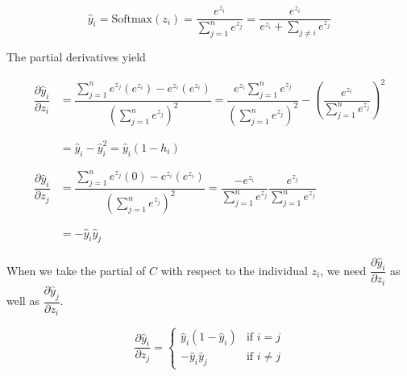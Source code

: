 \documentclass[pageno]{final_paper}
\begin{document}
\begin{equation}
    \label{eq: output layer value}
    \hat{y}_i = \text{Softmax}(z_i) = \dfrac{e^{z_i}}{\sum\limits_{j=1}^n e^{z_j}} = \dfrac{e^{z_i}}
    {e^{z_i} + \sum\limits_{j\neq i} e^{z_j}}
\end{equation}

The partial derivatives yield

\begin{equation}
    \label{eq: output partials}
    \begin{aligned}
        \dfrac{\partial \hat{y}_i}{\partial z_i} &= \dfrac{\sum\limits_{j=1}^n e^{z_j}(e^{z_i}) - e^{z_i}(e^{z_i})}
        {\left( \sum\limits_{j=1}^n e^{z_j} \right)^2}
        = \dfrac{e^{z_i}\sum\limits_{j=1}^n e^{z_j}}{\left( \sum\limits_{j=1}^n e^{z_j} \right)^2}
        - \left( \dfrac{e^{z_i}}{ \sum\limits_{j=1}^n e^{z_j} } \right)^2 \\
        &\phantom{=} \\
        &= \hat{y}_i - \hat{y}_i^2
        = \hat{y}_i\left( 1 - h_i \right) \\
        &\phantom{=} \\
        \dfrac{\partial \hat{y}_i}{\partial z_j} &= \dfrac{\sum\limits_{j=1}^n e^{z_j}(0) - e^{z_i}(e^{z_i})}
        {\left( \sum\limits_{j=1}^n e^{z_j} \right)^2}
        = \dfrac{-e^{z_i}}{\sum\limits_{j=1}^n e^{z_j}}\dfrac{e^{z_j}}{\sum\limits_{j=1}^n e^{z_j}} \\
        &\phantom{=} \\
        &= -\hat{y}_i\hat{y}_j
    \end{aligned}
\end{equation}

\newpage
When we take the partial of $C$ with respect to the individual $z_i$, we need
$\dfrac{\partial \hat{y}_i}{\partial z_i}$ as well as $\dfrac{\partial
\hat{y}_j}{\partial z_i}$.

$$
\dfrac{\partial \hat{y}_i}{\partial z_j} =
\begin{cases}
    \hat{y}_i(1-\hat{y}_i) & \text{if } i = j \\
    -\hat{y}_i\hat{y}_j & \text{if } i \neq j
\end{cases}
$$
\end{document}

